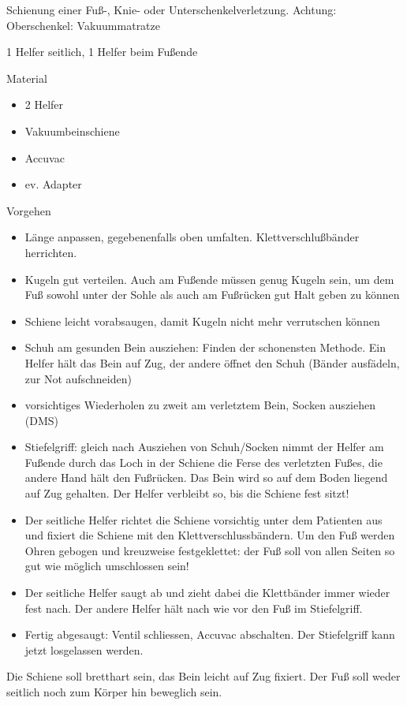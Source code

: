 \documentclass{article}
\begin{document}
Schienung einer Fu{\ss}-, Knie- oder Unterschenkelverletzung. Achtung:
Oberschenkel: Vakuummatratze

1 Helfer seitlich, 1 Helfer beim Fu{\ss}ende

Material

\begin{itemize}
\item 2 Helfer

\item Vakuumbeinschiene

\item Accuvac

\item ev. Adapter

\end{itemize}
Vorgehen

\begin{itemize}
\item L\"ange anpassen, gegebenenfalls oben umfalten.
Klettverschlu{\ss}b\"ander herrichten.

\item Kugeln gut verteilen. Auch am Fu{\ss}ende m\"ussen genug Kugeln
sein, um dem Fu{\ss} sowohl unter der Sohle als auch am Fu{\ss}r\"ucken
gut Halt geben zu k\"onnen

\item Schiene leicht vorabsaugen, damit Kugeln nicht mehr verrutschen
k\"onnen

\item Schuh am gesunden Bein ausziehen: Finden der schonensten Methode.
Ein Helfer h\"alt das Bein auf Zug, der andere \"offnet den Schuh
(B\"ander ausf\"adeln, zur Not aufschneiden)

\item vorsichtiges Wiederholen zu zweit am verletztem Bein, Socken
ausziehen (DMS)

\item Stiefelgriff: gleich nach Ausziehen von Schuh/Socken nimmt der
Helfer am Fu{\ss}ende durch das Loch in der Schiene die Ferse des
verletzten Fu{\ss}es, die andere Hand h\"alt den Fu{\ss}r\"ucken. Das
Bein wird so auf dem Boden liegend auf Zug gehalten. Der Helfer
verbleibt so, bis die Schiene fest sitzt!

\item Der seitliche Helfer richtet die Schiene vorsichtig unter dem
Patienten aus und fixiert die Schiene mit den Klettverschlussb\"andern.
Um den Fu{\ss} werden Ohren gebogen und kreuzweise festgeklettet: der
Fu{\ss} soll von allen Seiten so gut wie m\"oglich umschlossen sein!

\item Der seitliche Helfer saugt ab und zieht dabei die Klettb\"ander
immer wieder fest nach. Der andere Helfer h\"alt nach wie vor den
Fu{\ss} im Stiefelgriff.

\item Fertig abgesaugt: Ventil schliessen, Accuvac abschalten. Der
Stiefelgriff kann jetzt losgelassen werden.

\end{itemize}
Die Schiene soll bretthart sein, das Bein leicht auf Zug fixiert. Der
Fu{\ss} soll weder seitlich noch zum K\"orper hin beweglich sein.
\end{document}

